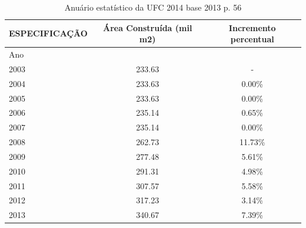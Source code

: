 \documentclass{report}
\begin{document}
\begin{table}[H]
\begin{tabular}{lcc}
\toprule
ESPECIFICAÇÃO &  Área Construída (mil m2) & Incremento percentual \\
\midrule
Ano  &                           &                       \\
2003 &  233.63 &  - \\
2004 &  233.63 &  0.00\% \\
2005 &  233.63 &  0.00\% \\
2006 &  235.14 &  0.65\% \\
2007 &  235.14 &  0.00\% \\
2008 &  262.73 &  11.73\% \\
2009 &  277.48 &  5.61\% \\
2010 &  291.31 &  4.98\% \\
2011 &  307.57 &  5.58\% \\
2012 &  317.23 &  3.14\% \\
2013 &  340.67 &  7.39\% \\
\bottomrule
\end{tabular}
\caption{Anuário estatístico da UFC 2014 base 2013 p. 56}
\label{table:area_construida-ufc}
\end{table}
\end{document}
